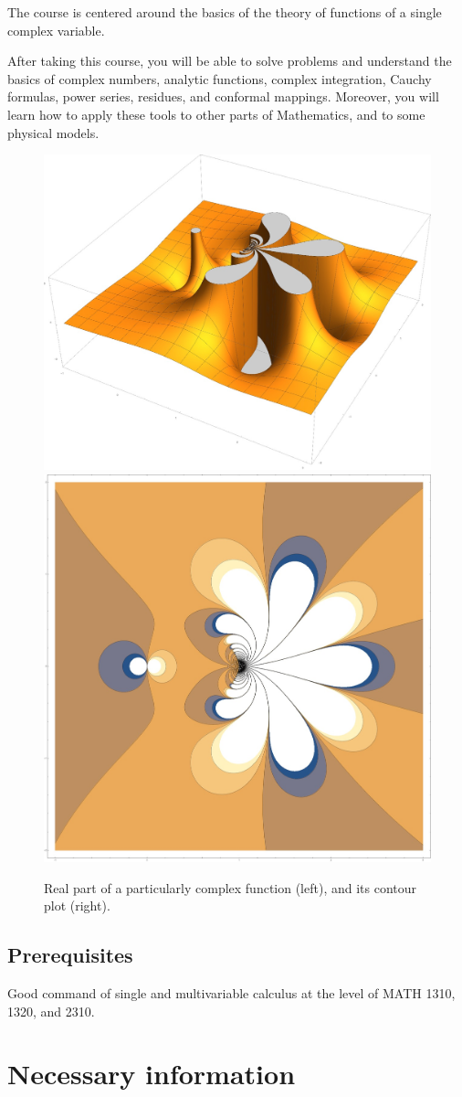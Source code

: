 \documentclass[oneside,11pt]{amsart}
\begin{document}
The course is centered around the basics of the theory of functions of a
single complex variable.

\medskip

After taking this course, you 
will be able to solve problems and understand the 
basics of
complex numbers, analytic functions, 
complex integration, Cauchy formulas, power series, 
residues, and conformal mappings.
Moreover, you will learn how to apply these tools to 
other parts of Mathematics, and to some physical models.

\begin{figure}[h]
	\includegraphics[height=.4\textwidth]{img/complex_f.jpg}
	\qquad 
	\includegraphics[height=.4\textwidth]{img/complex_f2.jpg}
	\caption{Real part of a particularly complex function (left), and 
	its contour plot (right).}
\end{figure}

\subsection*{Prerequisites}

Good command of single and multivariable calculus at the level of MATH 1310, 1320, and 2310.

\section{Necessary information}
\bigskip
\end{document}
